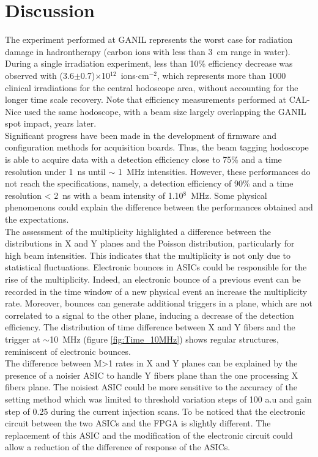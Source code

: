 \documentclass[a4paper,11pt]{article}
\begin{document}
\section{Discussion}

The experiment performed at GANIL represents the worst case for radiation damage in hadrontherapy (carbon ions with less than 3~cm range in water). During a single irradiation experiment, less than 10\% efficiency decrease was observed with (3.6$\pm$0.7)$\times$10$^{12}$~ions$\cdot$cm$^{-2}$, which represents more than 1000 clinical irradiations for the central hodoscope area, without accounting for the longer time scale recovery. Note that efficiency measurements performed at CAL-Nice used the same hodoscope, with a beam size largely overlapping the GANIL spot impact, years later.\\

Significant progress have been made in the development of firmware and configuration methods for acquisition boards. Thus, the beam tagging hodoscope is able to acquire data with a detection efficiency close to 75\% and a time resolution under 1~ns until $\sim$ 1~MHz intensities. However, these performances do not reach the specifications, namely, a detection efficiency of 90\% and a time resolution < 2~ns with a  beam intensity of 1.10$^{8}$~MHz. Some physical phenomenons could explain the difference between the performances obtained and the expectations.\\

The assessment of the multiplicity highlighted a difference between the distributions in X and Y planes and the Poisson distribution, particularly for high beam intensities. This indicates that the multiplicity is not only due to statistical fluctuations. Electronic bounces in ASICs could be responsible for the rise of the multiplicity. Indeed, an electronic bounce of a previous event can be recorded in the time window of a new physical event an increase the multiplicity rate. Moreover, bounces can generate additional triggers in a plane, which are not correlated to a signal to the other plane, inducing a decrease of the detection efficiency. The distribution of time difference between X and Y fibers and the trigger at $\sim$10~MHz (figure \ref{fig:Time_10MHz}) shows regular structures, reminiscent of electronic bounces.\\

The difference between M>1 rates in X and Y planes can be explained by the presence of a noisier ASIC to handle Y fibers plane than the one processing X fibers plane. The noisiest ASIC could be more sensitive to the accuracy of the setting method which was limited to threshold variation steps of 100 a.u and gain step of 0.25 during the current injection scans. To be noticed that the electronic circuit between the two ASICs and the FPGA is slightly different. The replacement of this ASIC and the modification of the electronic circuit could allow a reduction of the difference of response of the ASICs.
\end{document}
